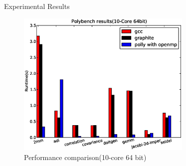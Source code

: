 \documentclass{beamer}
\begin{document}
\begin{frame}{Experimental Results}
\begin{figure}
\begin{center}
  \includegraphics[height=7cm]{images/10core64bit.eps}
  \caption{Performance comparison(10-core 64 bit)}
  \label{fig:10core}
\end{center}
\end{figure}
\end{frame}
\end{document}
